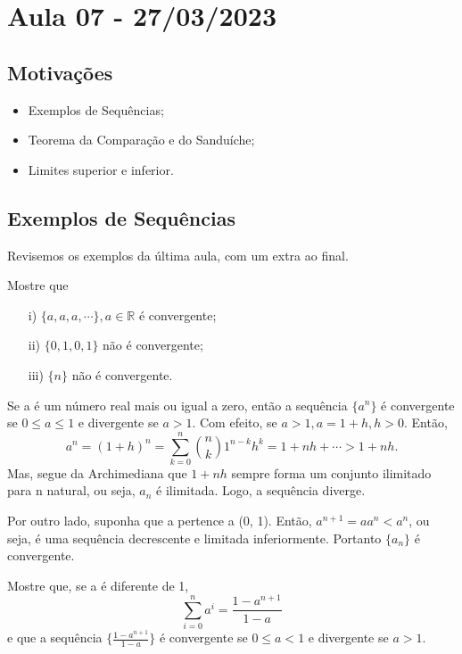 \documentclass[analysis_notes.tex]{subfiles}
\begin{document}
\section{Aula 07 - 27/03/2023}
\subsection{Motiva\c c\~oes}
\begin{itemize}
	\item Exemplos de Sequ\^encias;
	\item Teorema da Compara\c c\~ao e do Sandu\'iche;
	\item Limites superior e inferior.
\end{itemize}
\subsection{Exemplos de Sequ\^encias}
Revisemos os exemplos da \'ultima aula, com um extra ao final.
\begin{example}
	Mostre que
	\begin{itemize}
		\item[i)] $\{a, a, a, \cdots\},a\in \mathbb{R}$ \'e convergente;
		\item[ii)] $\{0, 1, 0, 1\}$ n\~ao \'e convergente;
		\item[iii)] $\{n\}$ n\~ao \'e convergente.
	\end{itemize}
\end{example}
\begin{example}
	Se a \'e um n\'umero real mais ou igual a zero, ent\~ao a sequ\^encia $\{a^{n}\}$ \'e convergente se $0\leq{a}\leq{1}$ e divergente
	se $a > 1$. Com efeito, se $a > 1, a = 1 + h, h > 0$. Ent\~ao,
	$$
		a^{n} = (1+h)^{n} = \sum\limits_{k=0}^{n}\binom{n}{k}1^{n-k}h^{k} = 1 + nh + \cdots > 1 + nh.
	$$
	Mas, segue da Archimediana que $1 + nh$ sempre forma um conjunto ilimitado para n natural, ou seja, $a_{n}$ \'e ilimitada. Logo, a sequ\^encia
	diverge.

	Por outro lado, suponha que a pertence a (0, 1). Ent\~ao, $a^{n+1} = a a^{n} < a^{n}$, ou seja, \'e uma sequ\^encia decrescente e limitada inferiormente.
	Portanto $\{a_{n}\}$ \'e convergente.
\end{example}
\begin{example}
	Mostre que, se a \'e diferente de 1,
	$$
		\sum\limits_{i=0}^{n}a^{i} = \frac{1-a^{n+1}}{1-a}
	$$
	e que a sequ\^encia $\biggl\{\frac{1-a^{n+1}}{1-a}\biggr\}$ \'e convergente se $0\leq{a}<1$ e divergente se $a > 1$.
\end{example}
\end{document}
